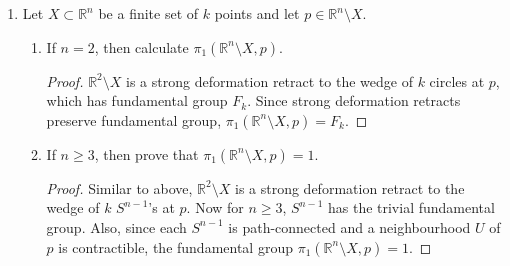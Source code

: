 \documentclass{article}
\begin{document}
\begin{enumerate}[label={\bf Q\arabic*:}]
\begin{enumerate}
        \begin{proof}
          A free group of rank $n$ is a cover of wedge of $n$ loops, i.e.
          $F_n=\pi_1(X,p)$, where
          \begin{equation*}
            X = \underbrace{S^1\vee\ldots\vee S^1}_{n\;\text{times}}.
          \end{equation*}
          Now since $G$ is a subgroup of $F_n$, by the one-to-one
          correspondence between subgroups of fundamental groups and
          connected covers, there is a connected cover $\tilde{X_G}$ of $X$
          such that $\pi_1(\tilde{X_G})=G$. Now from Hatcher, we know that
          a connected cover of a graph is also a graph, and the also the
          degree of the cover will equal to the index $r=[F_n:G]$ of the
          subgroup $G$ of $F_n$. Hence the connected cover will be a graph
          with $r$ vertices and $nr$ edges. Now from the previous part of
          this question, such a graph will have a rank of $m=1-r+nr$.
        \end{proof}
    \end{enumerate}

  \item Let $X\subset\mathbb{R}^n$ be a finite set of $k$ points and let
    $p\in\mathbb{R}^n\setminus X$.
    \begin{enumerate}
      \item If $n=2$, then calculate $\pi_1(\mathbb{R}^n\setminus X,p)$.
        \begin{proof}
          $\mathbb{R}^2\setminus X$ is a strong deformation retract to the
          wedge of $k$ circles at $p$, which has fundamental group $F_k$.
          Since strong deformation retracts preserve fundamental group,
          $\pi_1(\mathbb{R}^n\setminus X,p)=F_k$.
        \end{proof}

      \item If $n\geq3$, then prove that $\pi_1(\mathbb{R}^n\setminus
        X,p)=1$.
        \begin{proof}
          Similar to above, $\mathbb{R}^2\setminus X$ is a strong
          deformation retract to the wedge of $k$ $S^{n-1}$'s at $p$. Now
          for $n\geq 3$, $S^{n-1}$ has the trivial fundamental group. Also,
          since each $S^{n-1}$ is path-connected and a neighbourhood $U$
          of $p$ is contractible, the fundamental group
          $\pi_1(\mathbb{R}^n\setminus X,p)=1$.
        \end{proof}
    \end{enumerate}


\end{enumerate}
\end{document}
